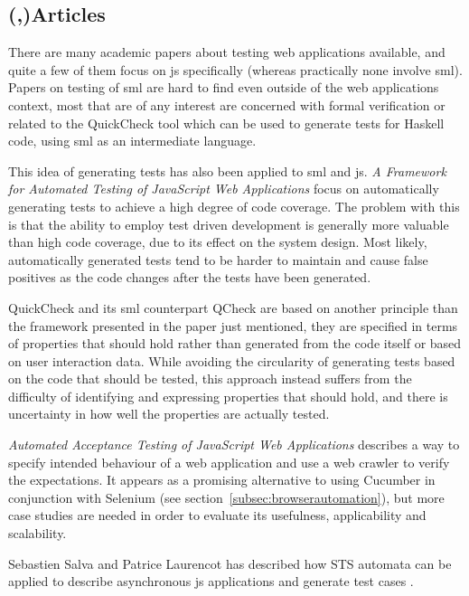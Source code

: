 \documentclass[11pt]{article}
\begin{document}
\subsection{(,)Articles}

There are many academic papers about testing web applications available, and quite a few of them focus on \gls{js} specifically (whereas practically none involve \gls{sml}). Papers on testing of \gls{sml} are hard to find even outside of the web applications context, most that are of any interest are concerned with formal verification or related to the QuickCheck tool which can be used to generate tests for Haskell code, using \gls{sml} as an intermediate language.

This idea of generating tests has also been applied to \gls{sml} and \gls{js}. \emph{A Framework for Automated Testing of JavaScript Web Applications} \cite{AutomatedTesting} focus on automatically generating tests to achieve a high degree of code coverage. The problem with this is that the ability to employ test driven development is generally more valuable than high code coverage, due to its effect on the system design. Most likely, automatically generated tests tend to be harder to maintain and cause false positives as the code changes after the tests have been generated.

QuickCheck and its \gls{sml} counterpart QCheck are based on another principle than the framework presented in the paper just mentioned, they are specified in terms of properties that should hold rather than generated from the code itself or based on user interaction data. While avoiding the circularity of generating tests based on the code that should be tested, this approach instead suffers from the difficulty of identifying and expressing properties that should hold, and there is uncertainty in how well the properties are actually tested.

\emph{Automated Acceptance Testing of JavaScript Web Applications} \cite{AutomatedAcceptance} describes a way to specify intended behaviour of a web application and use a web crawler to verify the expectations. It appears as a promising alternative to using Cucumber in conjunction with Selenium (see section~\ref{subsec:browserautomation}), but more case studies are needed in order to evaluate its usefulness, applicability and scalability. %

Sebastien Salva and Patrice Laurencot has described how STS automata can be applied to describe asynchronous \gls{js} applications and generate test cases \cite{AutomatedAjax}.
\end{document}
